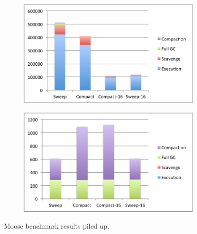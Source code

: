 \documentclass[10pt, sigplan]{acmart}
\begin{document}
\begin{figure}[thb]
	\begin{subfigure}[b]{.48\textwidth}
	\includegraphics[width=\linewidth]{figures/propCache} 
   	\end{subfigure} \hspace{0.03\textwidth}  \begin{subfigure}[b]{.48\textwidth}
	\includegraphics[width=\linewidth]{figures/release} 
   	\end{subfigure}
\caption{Moose benchmark results piled up.}
\label{MooseRes1}
\end{figure}
\end{document}
